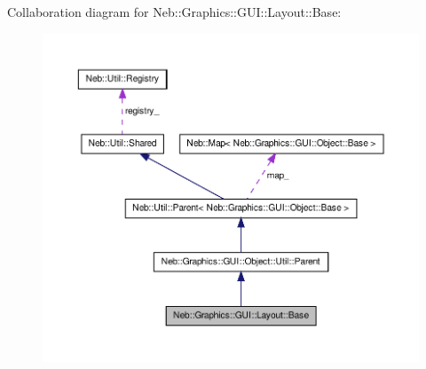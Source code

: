 \-Collaboration diagram for \-Neb\-:\-:\-Graphics\-:\-:\-G\-U\-I\-:\-:\-Layout\-:\-:\-Base\-:\nopagebreak
\begin{figure}[H]
\begin{center}
\leavevmode
\includegraphics[width=350pt]{classNeb_1_1Graphics_1_1GUI_1_1Layout_1_1Base__coll__graph}
\end{center}
\end{figure}
